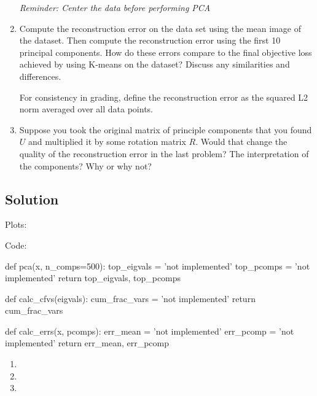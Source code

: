 \documentclass[submit]{harvardml}
\begin{document}
\begin{problem}
\begin{enumerate}
  \textit{Reminder: Center the data before performing PCA}

\item Compute the reconstruction error on the data set using the mean
  image of the dataset.  Then compute the reconstruction error using
  the first 10 principal components.  How do these errors compare to
  the final objective loss achieved by using K-means on the dataset?
  Discuss any similarities and differences.

  For consistency in grading, define the reconstruction error as the squared L2
  norm averaged over all data points.

\item Suppose you took the original matrix of principle components
  that you found $U$ and multiplied it by some rotation matrix $R$.
  Would that change the quality of the reconstruction error in the
  last problem?  The interpretation of the components?  Why or why
  not?
  
\end{enumerate}


\end{problem}

\newpage
\subsection*{Solution}
Plots:



Code:

\begin{python}
def pca(x, n_comps=500):
    top_eigvals = 'not implemented'
    top_pcomps = 'not implemented'
    return top_eigvals, top_pcomps


def calc_cfvs(eigvals):
    cum_frac_vars = 'not implemented'
    return cum_frac_vars


def calc_errs(x, pcomps):
    err_mean = 'not implemented'
    err_pcomp = 'not implemented'
    return err_mean, err_pcomp
\end{python}

\begin{enumerate}
  \item 
  \item 
  \item 
\end{enumerate}

\newpage
\end{document}
